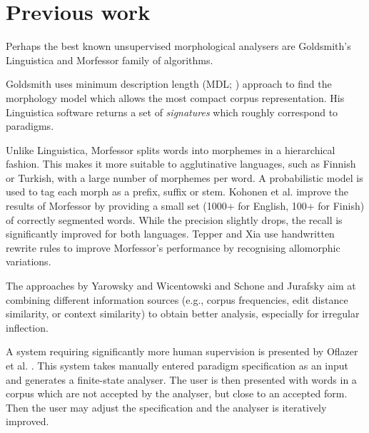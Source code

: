 \documentclass{itatnew}
\newcommand{\todojb}[1]{[\textbf{TODOJ} #1]} %
\begin{document}
\section{Previous work}

Perhaps the best known unsupervised morphological analysers are Goldsmith's Linguistica \cite{goldsmith01} and Morfessor \cite{creutz-lagus-2002-udm,creutz-lagus-2005,creutz07} family of algorithms. %

Gold\-smith uses minimum description length (MDL; \cite{rissanen-1989}) approach to find the morphology model which allows the most compact corpus representation. His Linguistica software returns a set of \emph{signatures} which roughly correspond to paradigms.


Unlike Linguistica, Morfessor splits words into morphemes in a hierarchical fashion. This makes it more suitable to agglutinative languages, such as Finnish or Turkish, with a large number of morphemes per word.
A probabilistic model is used to tag each morph as a prefix, suffix or stem.
%
Kohonen et al. \cite{kohonen-etal-2010} improve the results of Morfessor by providing a small set (1000+ for English, 100+ for Finish) of correctly segmented words.  While the precision slightly drops, the recall is significantly improved for both languages.
%
Tepper and Xia \cite{tepper10} use handwritten rewrite rules to improve Morfes\-sor's performance by recognising allomorphic variations.

The approaches by Yarowsky and Wicentowski \cite{yarowsky00} and Schone and Jurafsky \cite{schone01} aim at combining different information sources (e.g., corpus frequencies, edit distance similarity, or context similarity) to obtain better analysis, especially for irregular inflection.

A system requiring significantly more human supervision is presented by Oflazer et al. \cite{oflazer01}. This system takes manually entered paradigm specification as an input and generates a finite-state analyser. The user is then presented with words in a corpus which are not accepted by the analyser, but close to an accepted form. Then the user may adjust the specification and the analyser is iteratively improved.%
\end{document}

